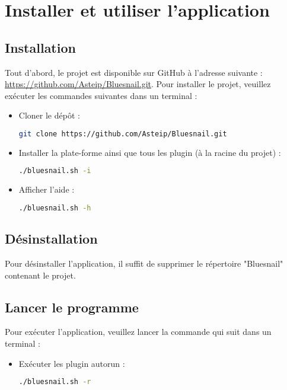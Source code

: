 \section{Installer et utiliser l'application}

\subsection{Installation}
    Tout d'abord, le projet est disponible sur GitHub à l'adresse suivante :  \url{https://github.com/Asteip/Bluesnail.git}. Pour installer le projet, veuillez exécuter les commandes suivantes dans un terminal :
    
    \begin{itemize}
        \item Cloner le dépôt :
        \begin{lstlisting}[language=bash]
        git clone https://github.com/Asteip/Bluesnail.git
        \end{lstlisting}
        
        \item Installer la plate-forme ainsi que tous les plugin (à la racine du projet) :
        \begin{lstlisting}[language=bash]
        ./bluesnail.sh -i
        \end{lstlisting}
        
        \item Afficher l'aide :
        \begin{lstlisting}[language=bash]
        ./bluesnail.sh -h
        \end{lstlisting}
    \end{itemize}
    
\subsection{Désinstallation}
    Pour désinstaller l'application, il suffit de supprimer le répertoire "Bluesnail" contenant le projet.
    
\subsection{Lancer le programme}
    Pour exécuter l'application, veuillez lancer la commande qui suit dans un terminal :

    \begin{itemize}
        \item Exécuter les plugin autorun :
        \begin{lstlisting}[language=bash]
        ./bluesnail.sh -r
        \end{lstlisting}
    \end{itemize}

